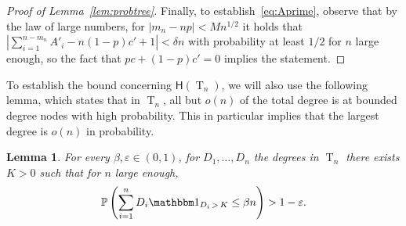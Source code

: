 \documentclass[10pt]{amsart}
\newtheorem{lemm}[theo]{Lemma}
\theoremstyle{definition}
\numberwithin{figure}{section}
\renewcommand{\P}{\mathbb{P}}
\newcommand{\height}{\mathsf{H}}
\DeclareMathOperator{\rtree}{T}
\newcommand{\I}[1]{{\mathbbm 1}_{#1}}
\begin{document}
\begin{proof}[Proof of Lemma~\ref{lem:probtree}]
Finally, to establish~\eqref{eq:Aprime}, observe that by the law of large numbers, for $|m_n-np|<Mn^{1/2}$ it holds that $|\sum_{i=1}^{n-m_n}A'_i-n(1-p)c'+1|<\delta n$ with probability at least $1/2$ for $n$ large enough, so the fact that $pc+(1-p)c'=0$ implies the statement.
\end{proof}

To establish the bound concerning $\height(\rtree_{n})$, we will also use the following lemma, which states that in $\rtree_n$, all but $o(n)$ of the total degree is at bounded degree nodes with high probability. This in particular implies that the largest degree is $o(n)$ in probability.

\begin{lemm}\label{lem:nomasshighdegrees}
For every $\beta,\varepsilon \in (0,1)$, for $D_1,\dots, D_n$ the degrees in $\rtree_n$ there exists $K>0$ such that for $n$ large enough,
\[
\P\left(\sum_{i=1}^n D_i\I{D_i\,>\,K}\leq \beta n \right)>1-\varepsilon.
\]
\end{lemm}
\end{document}
